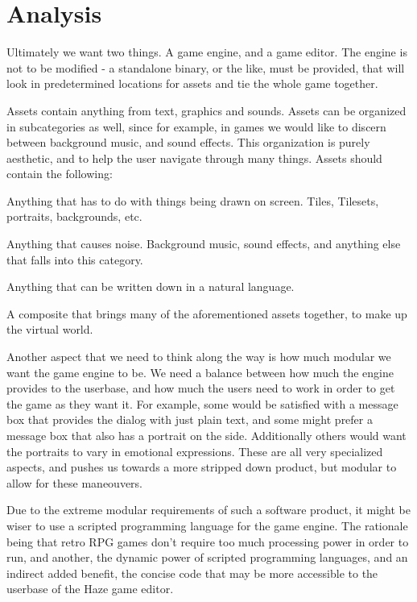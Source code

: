 \section{Analysis}

Ultimately we want two things. A game engine, and a game editor. The engine is 
not to be modified - a standalone binary, or the like, must be provided, that 
will look in predetermined locations for assets and tie the whole game
together.

Assets contain anything from text, graphics and sounds. Assets can be organized
in subcategories as well, since for example, in games we would like to discern
between background music, and sound effects. This organization is purely
aesthetic, and to help the user navigate through many things. Assets should 
contain the following:

\begin{description}
   Anything that has to do with things being drawn on screen.
    Tiles, Tilesets, portraits, backgrounds, etc.

   Anything that causes noise. Background music, sound effects, and
    anything else that falls into this category.

   Anything that can be written down in a natural language.

   A composite that brings many of the aforementioned assets
    together, to make up the virtual world.
\end{description}

Another aspect that we need to think along the way is how much modular we want 
the game engine to be. We need a balance between how much the engine provides
to the userbase, and how much the users need to work in order to get the game
as they want it. For example, some would be satisfied with a message box that 
provides the dialog with just plain text, and some might prefer a message box
that also has a portrait on the side. Additionally others would want the 
portraits to vary in emotional expressions. These are all very specialized
aspects, and pushes us towards a more stripped down product, but modular to
allow for these maneouvers. 

Due to the extreme modular requirements of such a software product, it might be
wiser to use a scripted programming language for the game engine. The rationale
being that retro RPG games don't require too much processing power in order to 
run, and another, the dynamic power of scripted programming languages, and an
indirect added benefit, the concise code that may be more accessible to the
userbase of the Haze game editor.

